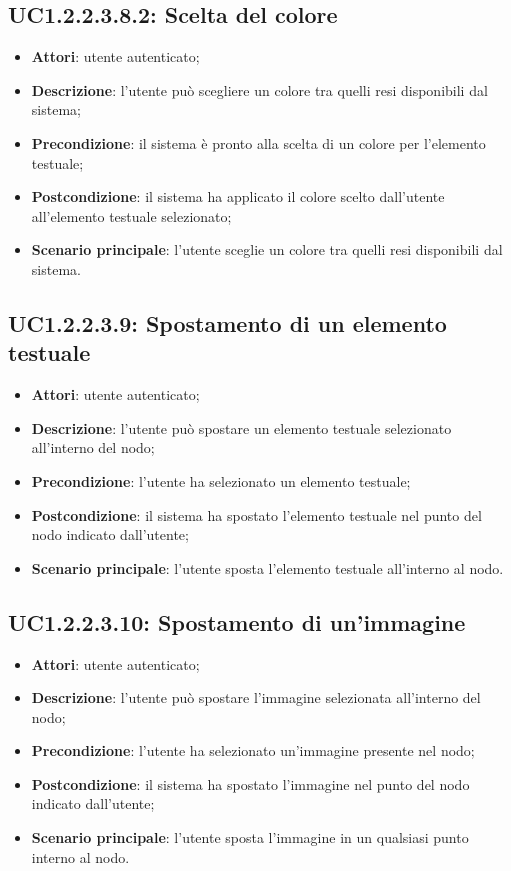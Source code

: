 \subsection{UC1.2.2.3.8.2: Scelta del colore}
\label{UC1.2.2.3.8.2}
\begin{itemize}
\item \textbf{Attori}: utente autenticato;
\item \textbf{Descrizione}: l'utente può scegliere un colore tra quelli resi disponibili dal sistema;
\item \textbf{Precondizione}: il sistema è pronto alla scelta di un colore per l'elemento testuale;
\item \textbf{Postcondizione}: il sistema ha applicato il colore scelto dall'utente all'elemento testuale selezionato;
\item \textbf{Scenario principale}:
l'utente sceglie un colore tra quelli resi disponibili dal sistema.
\end{itemize}
\subsection{UC1.2.2.3.9: Spostamento di un elemento testuale}
\label{UC1.2.2.3.9}
\begin{itemize}
\item \textbf{Attori}: utente autenticato;
\item \textbf{Descrizione}: l'utente può spostare un elemento testuale selezionato all'interno del nodo;
\item \textbf{Precondizione}: l'utente ha selezionato un elemento testuale;
\item \textbf{Postcondizione}: il sistema ha spostato l'elemento testuale nel punto del nodo indicato dall'utente;
\item \textbf{Scenario principale}:
l'utente sposta l'elemento testuale all'interno al nodo.
\end{itemize}
\subsection{UC1.2.2.3.10: Spostamento di un'immagine}
\label{UC1.2.2.3.10}
\begin{itemize}
\item \textbf{Attori}: utente autenticato;
\item \textbf{Descrizione}: l'utente può spostare l'immagine selezionata all'interno del nodo;
\item \textbf{Precondizione}: l'utente ha selezionato un'immagine presente nel nodo;
\item \textbf{Postcondizione}: il sistema ha spostato l'immagine nel punto del nodo indicato dall'utente;
\item \textbf{Scenario principale}:
l'utente sposta l'immagine in un qualsiasi punto interno al nodo.
\end{itemize}
